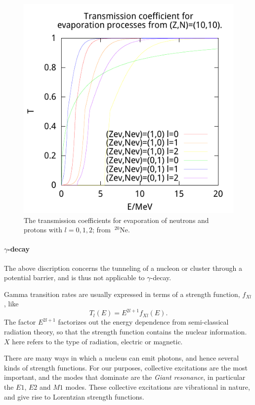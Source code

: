 \begin{figure}
\begin{center}
\includegraphics{figures/pot/np-transZ10N10.pdf}
\caption{\label{fig:np-tZ10N10} The transmission coefficients for evaporation of neutrons and protons with $l=0, 1, 2$; from $~^{20}\mathrm{Ne}$. }
\end{center}
\end{figure}

\paragraph{$\gamma$-decay}
The above discription concerns the tunneling of a nucleon or cluster through a potential barrier, and is thus not applicable to $\gamma$-decay.

Gamma transition rates are usually expressed in terms of a strength function, $f_{Xl}$, like
\begin{equation}
T_l(E) = E^{2l+1} f_{Xl}(E).\label{eq:gammat}
\end{equation}
The factor $E^{2l+1}$ factorizes out the energy dependence from semi-classical radiation theory, so that the strength function contains the nuclear information. $X$ here refers to the type of radiation, electric or magnetic.

There are many ways in which a nucleus can emit photons, and hence several kinds of strength functions.  For our purposes, collective excitations are the most important, and the modes that dominate are the \emph{Giant resonance}, in particular the $E1$, $E2$ and $M1$ modes\cite{ripl:2006}. These collective excitations are vibrational in nature, and give rise to Lorentzian strength functions.

